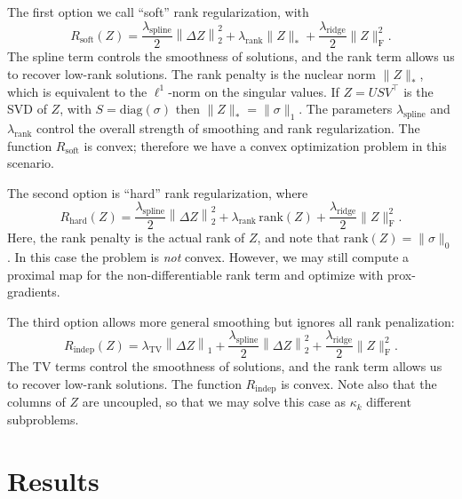 \documentclass[11pt]{article}
\begin{document}
The first option we call ``soft'' rank regularization, with
\begin{equation}
  \label{eq:regularization_soft}
  R_\mathrm{soft}(Z)
  =
  \frac{  \lambda_\mathrm{spline} }{2} \left\|\Delta Z\right\|_2^2
  +
  \lambda_\mathrm{rank} \| Z \|_*
  +
   \frac{\lambda_\mathrm{ridge}}{2}  \| Z \|_\mathrm{F}^2
   .
\end{equation}
The spline term controls the smoothness of solutions,
and the rank term allows us to recover low-rank solutions.
The rank penalty is the nuclear norm $\| Z \|_*$,
which is equivalent to the $\ell^1$-norm on the singular values.
If $Z = U S V^\intercal$ is the SVD of $Z$, with $S = \mathrm{diag}(\sigma)$ then $\| Z \|_* = \| \sigma \|_1$.
The parameters $\lambda_\mathrm{spline}$ and $\lambda_\mathrm{rank}$ control the overall strength
of smoothing and rank regularization.
The function $R_\mathrm{soft}$ is convex; therefore we have a convex optimization problem
in this scenario.

The second option is ``hard'' rank regularization, where
\begin{equation}
  \label{eq:regularization_soft}
  R_\mathrm{hard}(Z)
  =
  \frac{\lambda_\mathrm{spline}}{2} \left\|\Delta Z\right\|_2^2
  +
  \lambda_\mathrm{rank} \, \mathrm{rank}(Z)
  +
  \frac{\lambda_\mathrm{ridge}}{2} \| Z \|_\mathrm{F}^2
  .
\end{equation}
Here, the rank penalty is the actual rank of $Z$,
and note that $\mathrm{rank}(Z) = \| \sigma \|_0$.
In this case the problem is {\em not} convex.
However, we may still compute a proximal map for the non-differentiable rank term
and optimize with prox-gradients.

The third option allows more general smoothing but ignores all rank penalization:
\begin{equation}
  \label{eq:regularization_soft}
  R_\mathrm{indep}(Z)
  =
  \lambda_\mathrm{TV}
  \left\|\Delta Z\right\|_1
  +
  \frac{\lambda_\mathrm{spline}}{2} \left\|\Delta Z\right\|_2^2
  +
  \frac{\lambda_\mathrm{ridge}}{2} \| Z \|_\mathrm{F}^2
  .
\end{equation}
The TV terms control the smoothness of solutions,
and the rank term allows us to recover low-rank solutions.
The function $R_\mathrm{indep}$ is convex.
Note also that the columns of $Z$ are uncoupled,
so that we may solve this case as $\kappa_k$ different subproblems.


\section*{Results}\label{sec:results}
\end{document}
